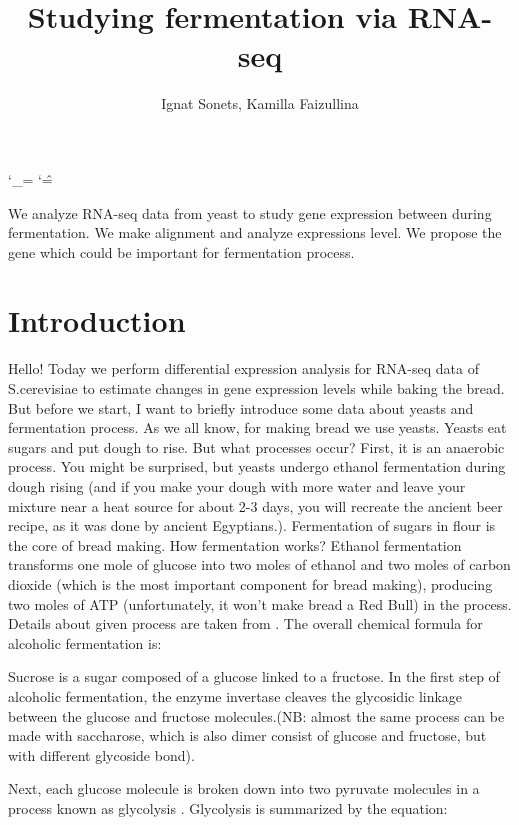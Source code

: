 \documentclass{article}
\title{Studying  fermentation via RNA-seq  }
\author{ Ignat Sonets, Kamilla Faizullina}
\date{\empty}
\begin{document}
	
		\catcode`\_=\active
	\catcode`\^=\active
	
\maketitle
 We analyze RNA-seq data from yeast  to study gene expression  between during fermentation. We make alignment and analyze expressions level. We propose the gene which could be important for fermentation process. 
 
\section{Introduction}
 
 Hello! Today we perform differential expression analysis for RNA-seq data of S.cerevisiae to estimate changes in gene expression levels while baking the bread. But before we start, I want to briefly introduce some data about yeasts and fermentation process.
 As we all  know, for making bread we use yeasts. Yeasts eat sugars and put dough to rise. But what processes occur? First, it is an anaerobic process. You might be surprised, but yeasts undergo ethanol fermentation during dough rising (and if you make your dough with more water and leave your mixture near a heat source for about 2-3 days, you will recreate the ancient beer recipe, as it was done by ancient Egyptians.). Fermentation of sugars in flour is the core of bread making. How fermentation works? Ethanol fermentation transforms one mole of glucose into two moles of ethanol and two moles of carbon dioxide (which is the most important component for bread making), producing two moles of ATP (unfortunately, it won't make bread a Red Bull) in the process. 
 Details about given process are taken from \cite{1}.
 The overall chemical formula for alcoholic fermentation is:
 
 
 Sucrose is a sugar composed of a glucose linked to a fructose. In the first step of alcoholic fermentation, the enzyme invertase cleaves the glycosidic linkage between the glucose and fructose molecules.(NB: almost the same process can be made with saccharose, which is also dimer consist of glucose and fructose, but with different glycoside bond).
 
 
 Next, each glucose molecule is broken down into two pyruvate molecules in a process known as glycolysis \cite{2}. Glycolysis is summarized by the equation:
 
\end{document}
